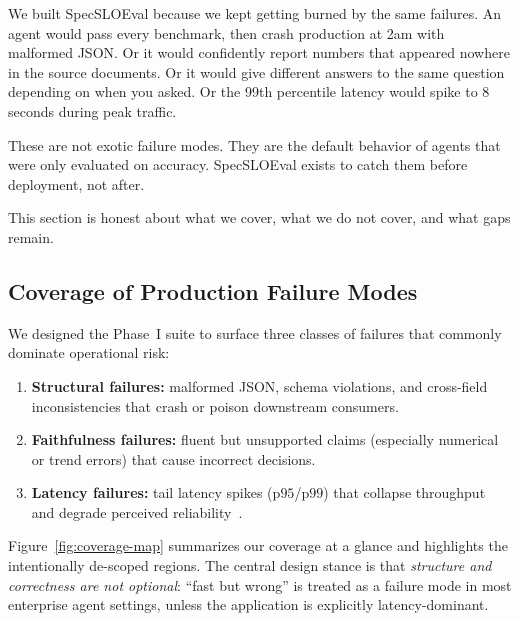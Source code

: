 \documentclass[11pt]{article}
\newcommand{\pninetyfive}{\ensuremath{\mathrm{p95}}}
\newcommand{\pninetynine}{\ensuremath{\mathrm{p99}}}
\begin{document}
We built SpecSLOEval because we kept getting burned by the same failures.
An agent would pass every benchmark, then crash production at 2am with malformed JSON.
Or it would confidently report numbers that appeared nowhere in the source documents.
Or it would give different answers to the same question depending on when you asked.
Or the 99th percentile latency would spike to 8 seconds during peak traffic.

These are not exotic failure modes.
They are the default behavior of agents that were only evaluated on accuracy.
SpecSLOEval exists to catch them before deployment, not after.

This section is honest about what we cover, what we do not cover, and what gaps remain.

\subsection{Coverage of Production Failure Modes}

We designed the Phase~I suite to surface three classes of failures that commonly dominate operational risk:

\begin{enumerate}[leftmargin=12pt]
    \item \textbf{Structural failures:} malformed JSON, schema violations, and cross-field inconsistencies that crash or poison downstream consumers.
    \item \textbf{Faithfulness failures:} fluent but unsupported claims (especially numerical or trend errors) that cause incorrect decisions.
    \item \textbf{Latency failures:} tail latency spikes (\pninetyfive/\pninetynine) that collapse throughput and degrade perceived reliability~\citep{dean2013tail}.
\end{enumerate}

Figure~\ref{fig:coverage-map} summarizes our coverage at a glance and highlights the intentionally de-scoped regions. The central design stance is that \emph{structure and correctness are not optional}: ``fast but wrong'' is treated as a failure mode in most enterprise agent settings, unless the application is explicitly latency-dominant.
\end{document}
